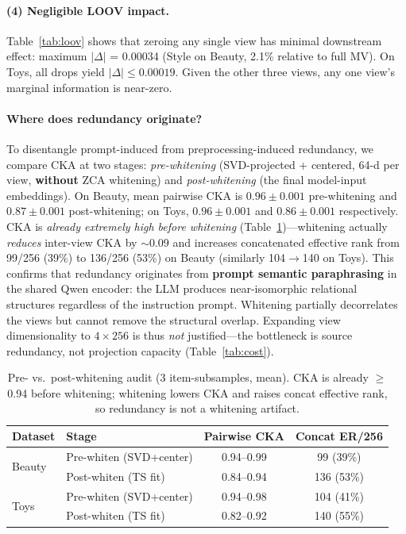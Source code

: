 \documentclass[sigconf,natbib=true,anonymous]{acmart}
\begin{document}
\paragraph{(4) Negligible LOOV impact.}
Table~\ref{tab:loov} shows that zeroing any single view has minimal downstream effect: maximum $|\Delta|$ = 0.00034 (Style on Beauty, 2.1\% relative to full MV).
On Toys, all drops yield $|\Delta| \le 0.00019$.
Given the other three views, any one view's marginal information is near-zero.

\paragraph{Where does redundancy originate?}
To disentangle prompt-induced from preprocessing-induced redundancy, we compare CKA at two stages: \emph{pre-whitening} (SVD-projected + centered, 64-d per view, \textbf{without} ZCA whitening) and \emph{post-whitening} (the final model-input embeddings).
On Beauty, mean pairwise CKA is $0.96\pm0.001$ pre-whitening and $0.87\pm0.001$ post-whitening; on Toys, $0.96\pm0.001$ and $0.86\pm0.001$ respectively.
CKA is \emph{already extremely high before whitening} (Table~\ref{tab:cka-prepost})---whitening actually \emph{reduces} inter-view CKA by $\sim$0.09 and increases concatenated effective rank from 99/256 (39\%) to 136/256 (53\%) on Beauty (similarly 104$\to$140 on Toys).
This confirms that redundancy originates from \textbf{prompt semantic paraphrasing} in the shared Qwen encoder: the LLM produces near-isomorphic relational structures regardless of the instruction prompt.
Whitening partially decorrelates the views but cannot remove the structural overlap.
Expanding view dimensionality to $4\times256$ is thus \emph{not} justified---the bottleneck is source redundancy, not projection capacity (Table~\ref{tab:cost}).

\begin{table}[t]
\centering
\caption{%
Pre- vs.\ post-whitening audit (3 item-subsamples, mean).
CKA is already $\ge$0.94 before whitening; whitening lowers CKA and raises concat effective rank, so redundancy is not a whitening artifact.%
}
\label{tab:cka-prepost}
\small
\begin{tabular}{@{}llcc@{}}
\toprule
Dataset & Stage & Pairwise CKA & Concat ER/256 \\
\midrule
\multirow{2}{*}{Beauty}
 & Pre-whiten (SVD+center)  & 0.94--0.99 & 99 (39\%) \\
 & Post-whiten (TS fit)     & 0.84--0.94 & 136 (53\%) \\
\midrule
\multirow{2}{*}{Toys}
 & Pre-whiten (SVD+center)  & 0.94--0.98 & 104 (41\%) \\
 & Post-whiten (TS fit)     & 0.82--0.92 & 140 (55\%) \\
\bottomrule
\end{tabular}
\end{table}
\end{document}

